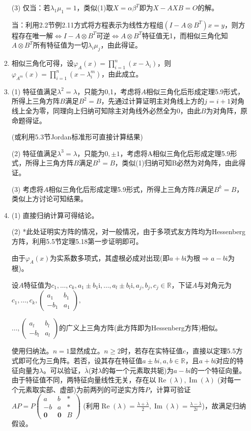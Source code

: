\documentclass[a4paper,UTF8,fontset=windows]{ctexart}
\DeclareMathOperator{\im}{Im}
\DeclareMathOperator{\re}{Re}
\begin{document}
\begin{enumerate}
(3) 仅当：若$\lambda_1\mu_1=1$，类似(1)取$X=\alpha\beta^T$即为$X-AXB=O$的解。

当：利用2.2节例2.11方式将方程表示为线性方程组$(I-A\otimes B^T)x=y$，则方程存在唯一解$\Leftrightarrow I-A\otimes B^T$可逆$\Leftrightarrow A\otimes B^T$特征值无1，而相似三角化知$A\otimes B^T$所有特征值为一切$\lambda_i\mu_j$，由此得证。

\item
相似三角化可得，设$\varphi_A(x)=\prod_{i=1}^{n}(x-\lambda_i)$，则$\varphi_{A^m}(x)=\prod_{i=1}^{n}(x-\lambda_i^m)$，由此成立。

\item
(1) 特征值满足$\lambda^2=\lambda$，只能为0,1，考虑将$A$相似三角化后形成定理5.9形式，所得上三角方阵$B$满足$B^2=B$，先通过计算证明主对角线上方的$j=i+1$对角线上全为零，同理向上归纳可知除主对角线外必然全为0，由此$B$为对角阵，原命题得证。

(或利用5.3节Jordan标准形可直接计算结果)

(2) 特征值满足$\lambda^3=\lambda$，只能为$0,\pm1$，考虑将A相似三角化后形成定理5.9形式，所得上三角方阵$B$满足$B^3=B$，类似(1)归纳可知B必然为对角阵，由此得证。

(3) 考虑将$A$相似三角化后形成定理5.9形式，所得上三角方阵$B$满足$B^k=B$，类似上方讨论可知结果。

\item
(1) 直接归纳计算可得结论。

(2) *此处证明实方阵的情况，对一般情况，由于多项式友方阵均为Hessenberg方阵，利用5.5节定理5.18第一步证明即可。

由于$\varphi_A(x)$为实系数多项式，其虚根必成对出现(即$a+b\mathrm{i}$为根$\Rightarrow a-b\mathrm{i}$为根)。

设$A$特征值为$c_1,\dots,c_k,a_1\pm b_1\mathrm{i},\dots,a_l\pm b_l\mathrm{i},a_j,b_j,c_j\in\mathbb{R}$，下证$A$与对角元为$c_1,\dots,c_k,\begin{pmatrix}a_1&b_1\\-b_1&a_1\end{pmatrix},$

$\dots,\begin{pmatrix}a_l&b_l\\-b_l&a_l\end{pmatrix}$的广义上三角方阵(此方阵即为Hessenberg方阵)相似。

使用归纳法。$n=1$显然成立。$n\ge2$时，若存在实特征值$c$，直接以定理5.5方式即可化为三角阵。若否，设其存在特征值$a\pm bi,a,b\in\mathbb{R}$，且$a+b\mathrm{i}$对应的特征向量为$\lambda$。可以验证，$\overline{\lambda}$(对$\lambda$的每一个元素取共轭)为$a-bi$的一个特征向量。由于特征值不同，两特征向量线性无关，存在以$\re(\lambda),\im(\lambda)$ (对每一个元素取实部、虚部)为前两列的可逆实方阵$P$，计算可验证$AP=P\begin{pmatrix}a&b&\ast\\-b&a&\ast\\\mathbf{0}&\mathbf{0}&B\end{pmatrix}$ (利用$\re(\lambda)=\frac{\lambda+\overline{\lambda}}{2},\im(\lambda)=\frac{\lambda-\overline{\lambda}}{2i}$)，故满足归纳假设。


\end{enumerate}
\end{document}
